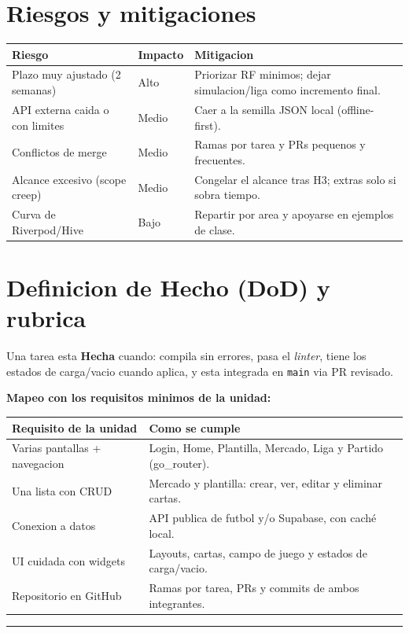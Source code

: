 \documentclass[11pt,a4paper]{article}
\begin{document}
\section{Riesgos y mitigaciones}
\renewcommand{\arraystretch}{1.3}
\begin{tabularx}{\textwidth}{@{}L{5.4cm} C{1.8cm} X@{}}
\toprule
\textbf{Riesgo} & \textbf{Impacto} & \textbf{Mitigacion} \\
\midrule
Plazo muy ajustado (2 semanas) & Alto & Priorizar RF minimos; dejar simulacion/liga como incremento final. \\
API externa caida o con limites & Medio & Caer a la semilla JSON local (offline-first). \\
Conflictos de merge & Medio & Ramas por tarea y PRs pequenos y frecuentes. \\
Alcance excesivo (scope creep) & Medio & Congelar el alcance tras H3; extras solo si sobra tiempo. \\
Curva de Riverpod/Hive & Bajo & Repartir por area y apoyarse en ejemplos de clase. \\
\bottomrule
\end{tabularx}

\section{Definicion de Hecho (DoD) y rubrica}
Una tarea esta \textbf{Hecha} cuando: compila sin errores, pasa el \emph{linter},
tiene los estados de carga/vacio cuando aplica, y esta integrada en \texttt{main} via
PR revisado.

\vspace{4pt}
\noindent\textbf{Mapeo con los requisitos minimos de la unidad:}
\renewcommand{\arraystretch}{1.3}
\begin{tabularx}{\textwidth}{@{}L{6.2cm} X@{}}
\toprule
\textbf{Requisito de la unidad} & \textbf{Como se cumple} \\
\midrule
Varias pantallas + navegacion & Login, Home, Plantilla, Mercado, Liga y Partido (go\_router). \\
Una lista con CRUD & Mercado y plantilla: crear, ver, editar y eliminar cartas. \\
Conexion a datos & API publica de futbol y/o Supabase, con caché local. \\
UI cuidada con widgets & Layouts, cartas, campo de juego y estados de carga/vacio. \\
Repositorio en GitHub & Ramas por tarea, PRs y commits de ambos integrantes. \\
\bottomrule
\end{tabularx}

\vfill
\noindent\textcolor{midgray}{\rule{\textwidth}{0.4pt}}\\[2pt]
\noindent{\small\textcolor{midgray}{Ultime Team Manager -- Sebastian Ramirez y Joaquin Parraud -- Unidad de Flutter.}}
\end{document}
